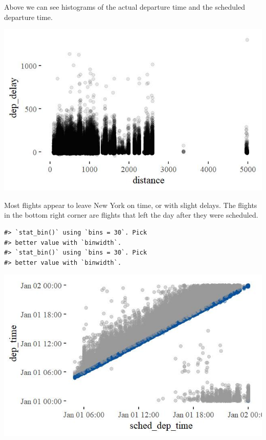 \documentclass[]{tufte-handout}
\begin{document}
Above we can see histograms of the actual departure time and the
scheduled departure time.

\includegraphics[width=0.75\linewidth,height=0.75\textheight]{flights_analysis_files/figure-latex/unnamed-chunk-3-1}

Most flights appear to leave New York on time, or with slight delays.
The flights in the bottom right corner are flights that left the day
after they were scheduled.

\begin{verbatim}
#> `stat_bin()` using `bins = 30`. Pick
#> better value with `binwidth`.
#> `stat_bin()` using `bins = 30`. Pick
#> better value with `binwidth`.
\end{verbatim}

\includegraphics[width=0.75\linewidth,height=0.75\textheight]{flights_analysis_files/figure-latex/unnamed-chunk-4-1}
\end{document}
